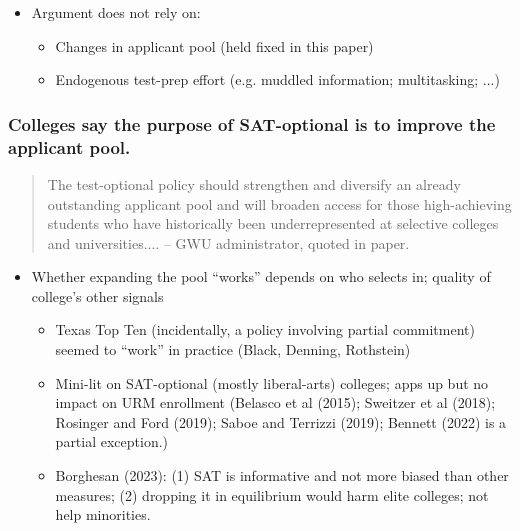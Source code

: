 \documentclass[11pt, aspectratio=169]{beamer}
\theoremstyle{plain}
\theoremstyle{plain}
\theoremstyle{plain}
\theoremstyle{plain}
\begin{document}
\begin{frame}
\begin{itemize}
        \item Argument does not rely on: \pause
        \begin{itemize}
            \item Changes in applicant pool (held fixed in this paper) \pause
            \item Endogenous test-prep effort (e.g. muddled information; multitasking; ...)
        \end{itemize}
    \end{itemize}
\end{frame}

\begin{frame}\frametitle{Colleges say the purpose of SAT-optional is to improve the applicant pool.}
    \begin{quotation} The test-optional policy should strengthen and diversify an already outstanding applicant pool and will broaden access for those high-achieving students who have historically been underrepresented at selective colleges and universities....
        -- GWU administrator, quoted in paper. \end{quotation} \pause
    \begin{itemize}
        \item Whether expanding the pool ``works'' depends on who selects in; quality of college's other signals \pause
        \begin{itemize}   %
            \item Texas Top Ten (incidentally, a policy involving partial commitment) seemed to ``work'' in practice (Black, Denning, Rothstein) \pause
            \item Mini-lit on SAT-optional (mostly liberal-arts) colleges; apps up but no impact on URM enrollment (Belasco et al (2015); Sweitzer et al (2018); Rosinger and Ford (2019); Saboe and Terrizzi (2019); Bennett (2022) is a partial exception.) \pause
            \item Borghesan (2023): (1) SAT is informative and not more biased than other measures; (2) dropping it in equilibrium would harm elite colleges; not help minorities.
        \end{itemize} 
    \end{itemize}
\end{frame}
\end{document}
